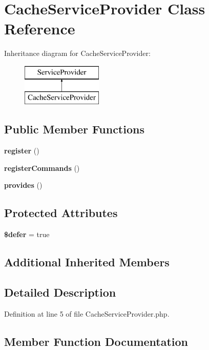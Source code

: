 \section{Cache\+Service\+Provider Class Reference}
\label{class_illuminate_1_1_cache_1_1_cache_service_provider}
Inheritance diagram for Cache\+Service\+Provider\+:\begin{figure}[H]
\begin{center}
\leavevmode
\includegraphics[height=2.000000cm]{class_illuminate_1_1_cache_1_1_cache_service_provider}
\end{center}
\end{figure}
\subsection*{Public Member Functions}
\begin{DoxyCompactItemize}
\item 
{\bf register} ()
\item 
{\bf register\+Commands} ()
\item 
{\bf provides} ()
\end{DoxyCompactItemize}
\subsection*{Protected Attributes}
\begin{DoxyCompactItemize}
\item 
{\bf \$defer} = true
\end{DoxyCompactItemize}
\subsection*{Additional Inherited Members}


\subsection{Detailed Description}


Definition at line 5 of file Cache\+Service\+Provider.\+php.



\subsection{Member Function Documentation}
